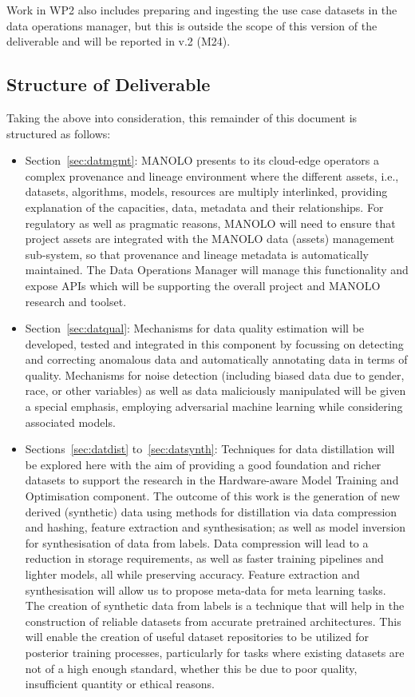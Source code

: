 \documentclass{manolo}
\begin{document}
Work in WP2 also includes preparing and ingesting the use case
datasets in the data operations manager, but this is outside the scope
of this version of the deliverable and will be reported in v.2 (M24).

\subsection{Structure of Deliverable}

Taking the above into consideration, this remainder of this document
is structured as follows:
%
\begin{itemize}
\item Section~\ref{sec:datmgmt}: MANOLO presents to its cloud-edge operators
  a complex provenance and lineage environment where the different
  assets, i.e., datasets, algorithms, models, resources are multiply
  interlinked, providing explanation of the capacities, data, metadata
  and their relationships. For regulatory as well as pragmatic
  reasons, MANOLO will need to ensure that project assets are
  integrated with the MANOLO data (assets) management sub-system, so
  that provenance and lineage metadata is automatically maintained.
  The Data Operations Manager will manage this functionality and
  expose APIs which will be supporting the overall project and MANOLO
  research and toolset.
\item Section~\ref{sec:datqual}: Mechanisms for data quality estimation will
  be developed, tested and integrated in this component by focussing
  on detecting and correcting anomalous data and automatically
  annotating data in terms of quality. Mechanisms for noise detection
  (including biased data due to gender, race, or other variables) as
  well as data maliciously manipulated will be given a special
  emphasis, employing adversarial machine learning while considering
  associated models.
\item Sections~\ref{sec:datdist} to~\ref{sec:datsynth}:
  Techniques for data distillation will be explored here with the aim
  of providing a good foundation and richer datasets to support the
  research in the Hardware-aware Model Training and Optimisation
  component. The outcome of this work is the generation of new derived
  (synthetic) data using methods for distillation via data compression
  and hashing, feature extraction and synthesisation; as well as model
  inversion for synthesisation of data from labels. Data compression
  will lead to a reduction in storage requirements, as well as faster
  training pipelines and lighter models, all while preserving
  accuracy. Feature extraction and synthesisation will allow us to
  propose meta-data for meta learning tasks. The creation of synthetic
  data from labels is a technique that will help in the construction
  of reliable datasets from accurate pretrained architectures. This
  will enable the creation of useful dataset repositories to be
  utilized for posterior training processes, particularly for tasks
  where existing datasets are not of a high enough standard, whether
  this be due to poor quality, insufficient quantity or ethical
  reasons.
\end{itemize}
\end{document}
